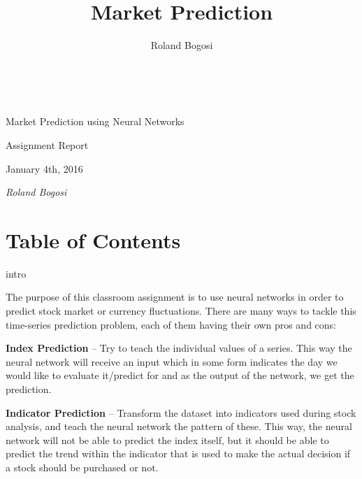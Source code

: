 \documentclass[a4paper,12pt]{article}
\author{Roland Bogosi}
\title{Market Prediction}
\begin{document}
\thispagestyle{empty}
	 
	\begin{center}
		\vspace{3.1in}
		
		{\sffamily\huge Market Prediction using Neural Networks}
		
		\vspace{0.4in}
		
		{\sffamily\LARGE Assignment Report}
		
		\vspace{0.3in}
		
		{\sffamily\Large January 4th, 2016}
		
		\vspace{3.2in}
	\end{center}
	
	\begin{flushright}
		{\sffamily\itshape\Large Roland Bogosi}
	\end{flushright}

\newpage
\thispagestyle{empty}
\section*{Table of Contents}

	\begingroup
	\renewcommand{\section}[2]{}
	\hypersetup{linkcolor=blue}
	\setlength{\parskip}{0em}
	\tableofcontents
	\endgroup

\newpage
\section{Introduction} \label{intro}

	The purpose of this classroom assignment is to use neural networks in order to predict stock market or currency fluctuations. There are many ways to tackle this time-series prediction problem, each of them having their own pros and cons:
	
	\textbf{Index Prediction} -- Try to teach the individual values of a series. This way the neural network will receive an input which in some form indicates the day we would like to evaluate it/predict for and as the output of the network, we get the prediction.
	
	\textbf{Indicator Prediction} -- Transform the dataset into indicators used during stock analysis, and teach the neural network the pattern of these. This way, the neural network will not be able to predict the index itself, but it should be able to predict the trend within the indicator that is used to make the actual decision if a stock should be purchased or not.
		
\end{document}

